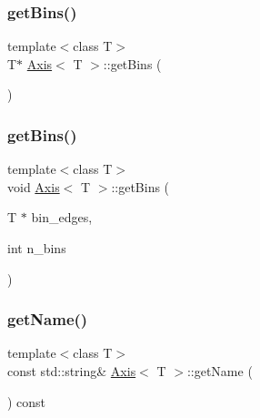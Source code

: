 \mbox{\label{class_axis_a7883af78a19bf5b90e8bd3f01663a1e0}} 
\subsubsection{\texorpdfstring{get\+Bins()}{getBins()}\hspace{0.1cm}{\footnotesize\ttfamily [1/2]}}
{\footnotesize\ttfamily template$<$class T$>$ \\
T$\ast$ \hyperlink{class_axis}{Axis}$<$ T $>$\+::get\+Bins (\begin{DoxyParamCaption}{ }\end{DoxyParamCaption})\hspace{0.3cm}{\ttfamily [inline]}}

\mbox{\label{class_axis_ad43663e7353a53557422b5902b4102d0}} 
\subsubsection{\texorpdfstring{get\+Bins()}{getBins()}\hspace{0.1cm}{\footnotesize\ttfamily [2/2]}}
{\footnotesize\ttfamily template$<$class T$>$ \\
void \hyperlink{class_axis}{Axis}$<$ T $>$\+::get\+Bins (\begin{DoxyParamCaption}\item[{T $\ast$}]{bin\+\_\+edges,  }\item[{int}]{n\+\_\+bins }\end{DoxyParamCaption})\hspace{0.3cm}{\ttfamily [inline]}}

\mbox{\label{class_axis_a26c562988320fa30f0bfbbc44c6f4bda}} 
\subsubsection{\texorpdfstring{get\+Name()}{getName()}}
{\footnotesize\ttfamily template$<$class T$>$ \\
const std\+::string\& \hyperlink{class_axis}{Axis}$<$ T $>$\+::get\+Name (\begin{DoxyParamCaption}{ }\end{DoxyParamCaption}) const\hspace{0.3cm}{\ttfamily [inline]}}

